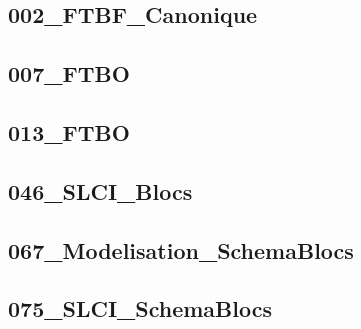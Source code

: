 \subsection{002\_FTBF\_Canonique}
\graphicspath{{../05-Modélisation Systèmes Asservis/TD/SLCI/SchemaBlocs/002_FTBF_Canonique/images/}{../05-Modélisation Systèmes Asservis/TD/SLCI/SchemaBlocs/002_FTBF_Canonique/}{../Style/png/}}


\subsection{007\_FTBO}
\graphicspath{{../05-Modélisation Systèmes Asservis/TD/SLCI/SchemaBlocs/007_FTBO/images/}{../05-Modélisation Systèmes Asservis/TD/SLCI/SchemaBlocs/007_FTBO/}{../Style/png/}}


\subsection{013\_FTBO}
\graphicspath{{../05-Modélisation Systèmes Asservis/TD/SLCI/SchemaBlocs/013_FTBO/images/}{../05-Modélisation Systèmes Asservis/TD/SLCI/SchemaBlocs/013_FTBO/}{../Style/png/}}


\subsection{046\_SLCI\_Blocs}
\graphicspath{{../05-Modélisation Systèmes Asservis/TD/SLCI/SchemaBlocs/046_SLCI_Blocs/images/}{../05-Modélisation Systèmes Asservis/TD/SLCI/SchemaBlocs/046_SLCI_Blocs/}{../Style/png/}}


\subsection{067\_Modelisation\_SchemaBlocs}
\graphicspath{{../05-Modélisation Systèmes Asservis/TD/SLCI/SchemaBlocs/067_Modelisation_SchemaBlocs/images/}{../05-Modélisation Systèmes Asservis/TD/SLCI/SchemaBlocs/067_Modelisation_SchemaBlocs/}{../Style/png/}}


\subsection{075\_SLCI\_SchemaBlocs}
\graphicspath{{../05-Modélisation Systèmes Asservis/TD/SLCI/SchemaBlocs/075_SLCI_SchemaBlocs/images/}{../05-Modélisation Systèmes Asservis/TD/SLCI/SchemaBlocs/075_SLCI_SchemaBlocs/}{../Style/png/}}


